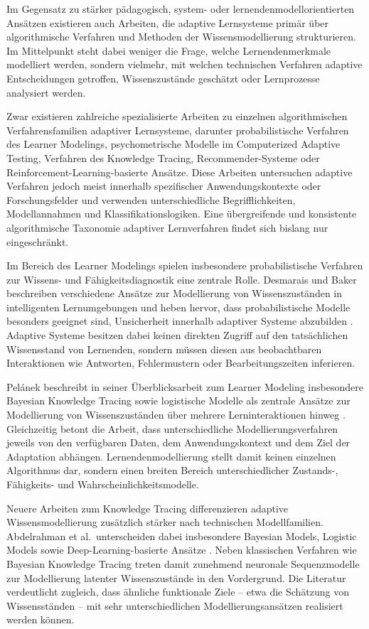 Im Gegensatz zu stärker pädagogisch, system- oder
lernendenmodellorientierten Ansätzen existieren auch Arbeiten, die
adaptive Lernsysteme primär über algorithmische Verfahren und Methoden
der Wissensmodellierung strukturieren. Im Mittelpunkt steht dabei
weniger die Frage, welche Lernendenmerkmale modelliert werden, sondern
vielmehr, mit welchen technischen Verfahren adaptive Entscheidungen
getroffen, Wissenszustände geschätzt oder Lernprozesse analysiert
werden.

Zwar existieren zahlreiche spezialisierte Arbeiten zu einzelnen
algorithmischen Verfahrensfamilien adaptiver Lernsysteme, darunter
probabilistische Verfahren des Learner Modelings, psychometrische
Modelle im Computerized Adaptive Testing, Verfahren des Knowledge
Tracing, Recommender-Systeme oder Reinforcement-Learning-basierte
Ansätze. Diese Arbeiten untersuchen adaptive Verfahren jedoch meist
innerhalb spezifischer Anwendungskontexte oder Forschungsfelder und
verwenden unterschiedliche Begrifflichkeiten, Modellannahmen und
Klassifikationslogiken. Eine übergreifende und konsistente
algorithmische Taxonomie adaptiver Lernverfahren findet sich bislang nur
eingeschränkt.

Im Bereich des Learner Modelings spielen insbesondere probabilistische
Verfahren zur Wissens- und Fähigkeitsdiagnostik eine zentrale Rolle.
Desmarais und Baker beschreiben verschiedene Ansätze zur Modellierung
von Wissenszuständen in intelligenten Lernumgebungen und heben hervor,
dass probabilistische Modelle besonders geeignet sind, Unsicherheit
innerhalb adaptiver Systeme abzubilden \citep{Desmarais2012}. Adaptive
Systeme besitzen dabei keinen direkten Zugriff auf den tatsächlichen
Wissensstand von Lernenden, sondern müssen diesen aus beobachtbaren
Interaktionen wie Antworten, Fehlermustern oder Bearbeitungszeiten
inferieren.

Pelánek beschreibt in seiner Überblicksarbeit zum Learner Modeling
insbesondere Bayesian Knowledge Tracing sowie logistische Modelle als
zentrale Ansätze zur Modellierung von Wissenszuständen über mehrere
Lerninteraktionen hinweg \citep{Pelanek2017}. Gleichzeitig betont die
Arbeit, dass unterschiedliche Modellierungsverfahren jeweils von den
verfügbaren Daten, dem Anwendungskontext und dem Ziel der Adaptation
abhängen. Lernendenmodellierung stellt damit keinen einzelnen
Algorithmus dar, sondern einen breiten Bereich unterschiedlicher
Zustands-, Fähigkeits- und Wahrscheinlichkeitsmodelle.

Neuere Arbeiten zum Knowledge Tracing differenzieren adaptive
Wissensmodellierung zusätzlich stärker nach technischen Modellfamilien.
Abdelrahman et al.~unterscheiden dabei insbesondere Bayesian Models,
Logistic Models sowie Deep-Learning-basierte Ansätze
\citep{Abdelrahman2023}. Neben klassischen Verfahren wie Bayesian
Knowledge Tracing treten damit zunehmend neuronale Sequenzmodelle zur
Modellierung latenter Wissenszustände in den Vordergrund. Die Literatur
verdeutlicht zugleich, dass ähnliche funktionale Ziele -- etwa die
Schätzung von Wissensständen -- mit sehr unterschiedlichen
Modellierungsansätzen realisiert werden können.

